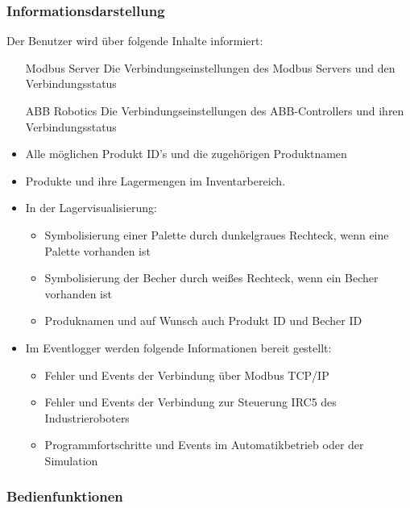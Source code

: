 \subsubsection{Informationsdarstellung}
Der Benutzer wird über folgende Inhalte informiert:\\
\begin{itemize}
    \item [Modbus Server] Die Verbindungseinstellungen des Modbus Servers und den Verbindungsstatus
    \item [ABB Robotics] Die Verbindungseinstellungen des ABB-Controllers und ihren Verbindungsstatus
    \item Alle möglichen Produkt ID's und die zugehörigen Produktnamen
    \item Produkte und ihre Lagermengen im Inventarbereich.
    \item In der Lagervisualisierung:
    \begin{itemize}
        \item Symbolisierung einer Palette durch dunkelgraues Rechteck, wenn eine Palette vorhanden ist
        \item Symbolisierung der Becher durch weißes Rechteck, wenn ein Becher vorhanden ist
        \item Produknamen und auf Wunsch auch Produkt ID und Becher ID
    \end{itemize}
    \item Im Eventlogger werden folgende Informationen bereit gestellt:
    \begin{itemize}
        \item Fehler und Events der Verbindung über Modbus TCP/IP
        \item Fehler und Events der Verbindung zur Steuerung IRC5 des Industrieroboters
        \item Programmfortschritte und Events im Automatikbetrieb oder der Simulation
    \end{itemize}
\end{itemize}
\subsubsection{Bedienfunktionen}



